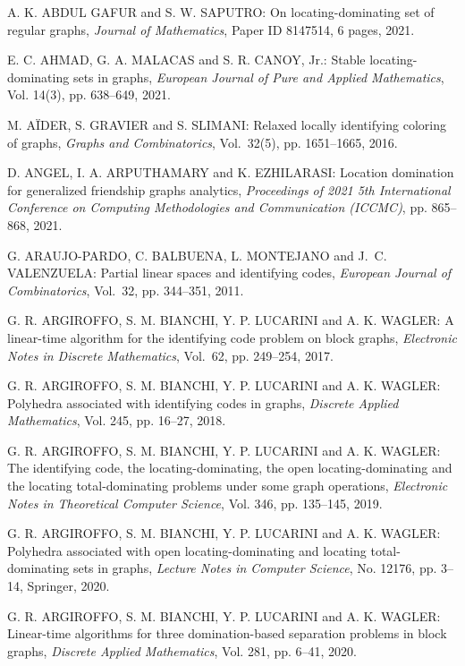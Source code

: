 \begin{thebibliography}{999}

A. K. ABDUL GAFUR and S. W. SAPUTRO: On locating-dominating set of regular graphs, {\it Journal of Mathematics}, Paper ID 8147514, 6 pages, 2021.

E. C. AHMAD, G. A. MALACAS and S. R. CANOY, Jr.: Stable locating-dominating sets in graphs, {\it European Journal of Pure and Applied Mathematics}, Vol. 14(3), pp. 638--649, 2021.

M. A\"IDER, S. GRAVIER and S. SLIMANI: Relaxed locally identifying coloring of graphs, {\it Graphs and Combinatorics}, Vol.~32(5), pp. 1651--1665, 2016.

D. ANGEL, I. A. ARPUTHAMARY and K. EZHILARASI:  Location domination for generalized friendship graphs analytics, {\it Proceedings of 2021 5th International Conference on Computing Methodologies and Communication (ICCMC)}, pp. 865--868, 2021.

G. ARAUJO-PARDO, C. BALBUENA, L. MONTEJANO and J.~C. VALENZUELA: Partial linear spaces and identifying codes, {\it European Journal of Combinatorics}, Vol.~32, pp. 344--351, 2011.

G. R. ARGIROFFO, S. M. BIANCHI, Y. P. LUCARINI and A. K. WAGLER: A linear-time algorithm for the identifying code problem on block graphs, {\it Electronic Notes in Discrete Mathematics}, Vol.~62, pp. 249--254, 2017.

G. R. ARGIROFFO, S. M. BIANCHI, Y. P. LUCARINI and A. K. WAGLER: Polyhedra associated with identifying codes in graphs, {\it Discrete Applied Mathematics}, Vol. 245, pp. 16--27, 2018.

G. R. ARGIROFFO, S. M. BIANCHI, Y. P. LUCARINI and A. K. WAGLER: The identifying code, the locating-dominating, the open locating-dominating and the locating total-dominating problems under some graph operations, {\it Electronic Notes in Theoretical Computer Science}, Vol. 346, pp. 135--145, 2019.

G. R. ARGIROFFO, S. M. BIANCHI, Y. P. LUCARINI and A. K. WAGLER: Polyhedra associated with open locating-dominating and locating total-dominating sets in graphs, {\it Lecture Notes in Computer Science}, No. 12176, pp. 3--14, Springer, 2020.

G. R. ARGIROFFO, S. M. BIANCHI, Y. P. LUCARINI and A. K. WAGLER: Linear-time algorithms for three domination-based separation problems in block graphs, {\it Discrete Applied Mathematics}, Vol. 281, pp. 6--41, 2020.


\end{thebibliography}
